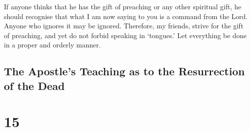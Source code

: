 If anyone thinks that he has the gift of preaching or any
other spiritual gift, he should recognise that what I am now saying to
you is a command from the Lord.  Anyone who ignores it may
be ignored.  Therefore, my friends, strive for the gift of
preaching, and yet do not forbid speaking in `tongues.' 
Let everything be done in a proper and orderly manner.

\hypertarget{the-apostles-teaching-as-to-the-resurrection-of-the-dead}{%
\subsection{The Apostle's Teaching as to the Resurrection of the
Dead}\label{the-apostles-teaching-as-to-the-resurrection-of-the-dead}}

\hypertarget{section-14}{%
\section{15}\label{section-14}}

